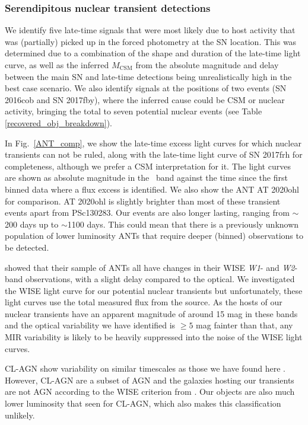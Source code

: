 \documentclass[a4paper,oneside,12pt, class=Latex/Classes/PhDthesisPSnPDF, crop=false]{standalone}
\begin{document}
\subsubsection{Serendipitous nuclear transient detections}
\label{sec:discussion:nuclear}
We identify five late-time signals that were most likely due to host activity that was (partially) picked up in the forced photometry at the SN location. This was determined due to a combination of the shape and duration of the late-time light curve, as well as the inferred $M_\text{CSM}$ from the absolute magnitude and delay between the main SN and late-time detections being unrealistically high in the best case scenario. We also identify signals at the positions of two events (SN 2016cob and SN 2017fby), where the inferred cause could be CSM or nuclear activity, bringing the total to seven potential nuclear events (see Table \ref{recovered_obj_breakdown}).

In Fig.~\ref{ANT_comp}, we show the late-time excess light curves for which nuclear transients can not be ruled, along with the late-time light curve of SN 2017frh for completeness, although we prefer a CSM interpretation for it. The light curves are shown as absolute magnitude in the \ztfr\ band against the time since the first binned data where a flux excess is identified. We also show the ANT AT 2020ohl \citep{2020ohl_Hinkle} for comparison. AT 2020ohl is slightly brighter than most of these transient events apart from PSc130283. Our events are also longer lasting, ranging from $\sim$200 days up to $\sim$1100 days. This could mean that there is a previously unknown population of lower luminosity ANTs that require deeper (binned) observations to be detected.

\citet{wiseman_ztfants} showed that their sample of ANTs all have changes in their WISE \textit{W1}- and \textit{W2}-band observations, with a slight delay compared to the optical. We investigated the WISE light curve for our potential nuclear transients but unfortunately, these light curves use the total measured flux from the source. As the hosts of our nuclear transients have an apparent magnitude of around 15 mag in these bands and the optical variability we have identified is $\geq5$ mag fainter than that, any MIR variability is likely to be heavily suppressed into the noise of the WISE light curves.

CL-AGN show variability on similar timescales as those we have found here \citep{CLAGN}. However, CL-AGN are a subset of AGN and the galaxies hosting our transients are not AGN according to the WISE criterion from \citet{WISE_crit}. Our objects are also much lower luminosity that seen for CL-AGN, which also makes this classification unlikely.
\end{document}
